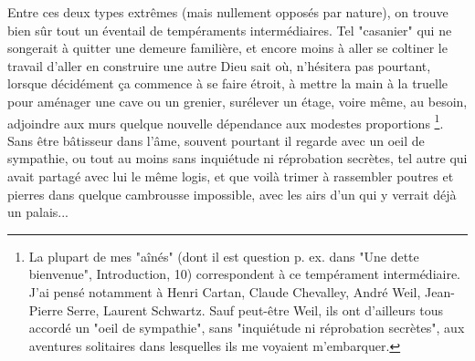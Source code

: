 Entre ces deux types extrêmes (mais nullement opposés par nature), on trouve bien sûr tout un éventail de tempéraments intermédiaires. Tel "casanier" qui ne songerait à quitter une demeure familière, et encore moins à aller se coltiner le travail d'aller en construire une autre Dieu sait où, n'hésitera pas pourtant, lorsque décidément ça commence à se faire étroit, à mettre la main à la truelle pour aménager une cave ou un grenier, surélever un étage, voire même, au besoin, adjoindre aux murs quelque nouvelle dépendance aux modestes proportions \footnote{La plupart de mes "aînés" (dont il est question p. ex. dans "Une dette bienvenue", Introduction, 10) correspondent à ce tempérament intermédiaire. J'ai pensé notamment à Henri Cartan, Claude Chevalley, André Weil, Jean-Pierre Serre, Laurent Schwartz. Sauf peut-être Weil, ils ont d'ailleurs tous accordé un "oeil de sympathie", sans "inquiétude ni réprobation secrètes", aux aventures solitaires dans lesquelles ils me voyaient m'embarquer.}. Sans être bâtisseur dans l'âme, souvent pourtant il regarde avec un oeil de sympathie, ou tout au moins sans inquiétude ni réprobation secrètes, tel autre qui avait partagé avec lui le même logis, et que voilà trimer à rassembler poutres et pierres dans quelque cambrousse impossible, avec les airs d'un qui y verrait déjà un palais...



